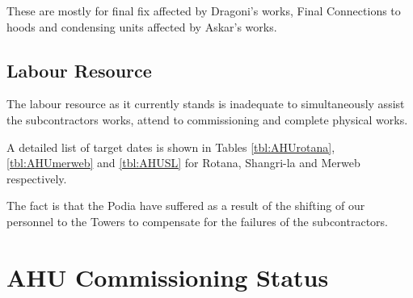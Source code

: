 These are mostly for final fix affected by Dragoni's works, Final Connections to hoods and condensing units affected by Askar's works.

\subsection{Labour Resource}

The labour resource as it currently stands is inadequate to simultaneously assist the subcontractors works, attend to commissioning and complete physical works.

A detailed list of target dates is shown in Tables \ref{tbl:AHUrotana}, \ref{tbl:AHUmerweb} and \ref{tbl:AHUSL} for Rotana, Shangri-la and Merweb respectively. 

The fact is that the Podia have suffered as a result of the shifting of our personnel to the Towers to compensate for the failures of the subcontractors. 

\protect{}

\DeclareRobustCommand\pulleys{\Bend Pulleys ordered.}
\DeclareRobustCommand\snags{\Bend Rectification works.}

\section{AHU Commissioning Status}

